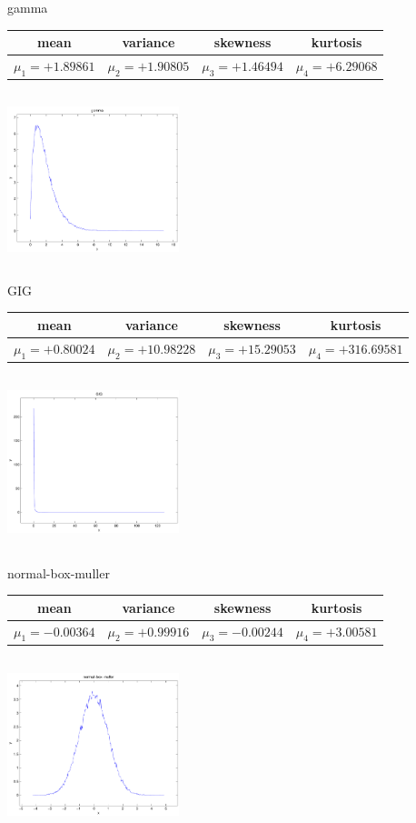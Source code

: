 \documentclass[9pt]{article}
\theoremstyle{plain}
\theoremstyle{definition}
\theoremstyle{remark}
\numberwithin{equation}{section}
\begin{document}
\newpage
gamma \begin{tabular}{|c|c|c|c|}  mean & variance & skewness & kurtosis \\  \hline
$\mu_1 = +1.89861$ & $\mu_2 = +1.90805$ & $\mu_3 = +1.46494$ & $\mu_4 =+6.29068$ \\
\end{tabular}

\includegraphics[width=5cm,height=5cm]{gamma.pdf}

GIG \begin{tabular}{|c|c|c|c|}  mean & variance & skewness & kurtosis \\  \hline
$\mu_1 = +0.80024$ & $\mu_2 = +10.98228$ & $\mu_3 = +15.29053$ & $\mu_4 =+316.69581$ \\
\end{tabular}

\includegraphics[width=5cm,height=5cm]{GIG.pdf}

normal-box-muller \begin{tabular}{|c|c|c|c|}  mean & variance & skewness & kurtosis \\  \hline
$\mu_1 = -0.00364$ & $\mu_2 = +0.99916$ & $\mu_3 = -0.00244$ & $\mu_4 =+3.00581$ \\
\end{tabular}

\includegraphics[width=5cm,height=5cm]{normal-box-muller.pdf}
\end{document}
